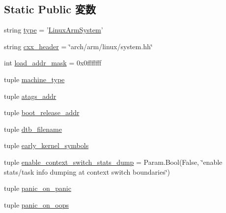 \subsection*{Static Public 変数}
\begin{DoxyCompactItemize}
\item 
string \hyperlink{classArmSystem_1_1LinuxArmSystem_acce15679d830831b0bbe8ebc2a60b2ca}{type} = '\hyperlink{classArmSystem_1_1LinuxArmSystem}{LinuxArmSystem}'
\item 
string \hyperlink{classArmSystem_1_1LinuxArmSystem_a17da7064bc5c518791f0c891eff05fda}{cxx\_\-header} = \char`\"{}arch/arm/linux/system.hh\char`\"{}
\item 
int \hyperlink{classArmSystem_1_1LinuxArmSystem_abd9c5cc6b7da624a69344d571bab1038}{load\_\-addr\_\-mask} = 0x0fffffff
\item 
tuple \hyperlink{classArmSystem_1_1LinuxArmSystem_a30a672590b773c4857ffd191f3f279fe}{machine\_\-type}
\item 
tuple \hyperlink{classArmSystem_1_1LinuxArmSystem_a1721cc28bb89d0cba6dd7ab7ee8e87cf}{atags\_\-addr}
\item 
tuple \hyperlink{classArmSystem_1_1LinuxArmSystem_a7a0e13725a1076aaea1a7fee12de0d2f}{boot\_\-release\_\-addr}
\item 
tuple \hyperlink{classArmSystem_1_1LinuxArmSystem_ab0f96c7f19a38e7fa5b4806fed0078ac}{dtb\_\-filename}
\item 
tuple \hyperlink{classArmSystem_1_1LinuxArmSystem_ad2b37df25c6d2bb66de60dd18f5696b6}{early\_\-kernel\_\-symbols}
\item 
tuple \hyperlink{classArmSystem_1_1LinuxArmSystem_ac718c043f724948b038fc16de7f90860}{enable\_\-context\_\-switch\_\-stats\_\-dump} = Param.Bool(False, \char`\"{}enable stats/task info dumping at context switch boundaries\char`\"{})
\item 
tuple \hyperlink{classArmSystem_1_1LinuxArmSystem_aef4b77baebee6bcd442d2607855f8566}{panic\_\-on\_\-panic}
\item 
tuple \hyperlink{classArmSystem_1_1LinuxArmSystem_a8578823f13862675c5afca849c58d129}{panic\_\-on\_\-oops}
\end{DoxyCompactItemize}


